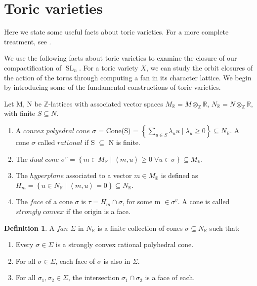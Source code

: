 \documentclass{amsart}
\newcommand{\R}{\mathbb{R}}
\newcommand{\Z}{\mathbb{Z}}
\DeclareMathOperator{\SL}{SL}
\theoremstyle{definition}
\newtheorem{definition}[theorem]{Definition}
\theoremstyle{remark}
\numberwithin{equation}{section}
\begin{document}
\appendix

\section{Toric varieties}

Here we state some useful facts about toric varieties. For a more complete treatment, see \cite{TV}.

We use the following facts about toric varieties to examine the closure of our compactification of $\SL_n$. For a toric variety $X$, we can study the orbit closures of the action of the torus through computing a fan in its character lattice.  We begin by introducing some of the fundamental constructions of toric varieties. 

Let M, N be $\Z$-lattices with associated vector spaces $M_\R = M\otimes_\Z \R$, $N_\R = N \otimes_\Z \R$, with finite $S \subseteq N$.

\begin{enumerate}

\item A $convex\; polyedral\; cone$ $\sigma$ = Cone(S) = $\left\{ {\displaystyle\sum\limits_{u\in S}\lambda_uu \; |\; \lambda_u \geq 0}\right\}\subseteq N_\R$. A cone $\sigma$ called $rational$ if S $\subseteq$ N is finite. 


\item The $dual \; cone$ $\sigma^v = \left\{ { m \in M_\R \; | \; \left\langle{m,u}\right\rangle \geq 0\; \forall u \in \sigma }\right\}\subseteq M_\R$. 

\item The $hyperplane$ associated to a vector $m \in M_\R$ is defined as $H_m = \left\{ {u \in N_\R \; | \;\left\langle{m,u}\right\rangle = 0}\right\}\subseteq N_\R$. 

\item The $face$ of a cone $\sigma$ is $\tau = H_m \cap \sigma$, for some m $\in \sigma^v$. A cone is called $strongly\; convex$ if the origin is a face. 


\end{enumerate}

\begin{definition}
A $fan$ $\Sigma$ in $N_\R$ is a finite collection of cones $\sigma \subseteq N_\R$ such that:
\begin{enumerate}
\item Every $\sigma \in \Sigma$ is a strongly convex rational polyhedral cone.
\item For all $\sigma \in \Sigma$, each face of $\sigma$ is also in $\Sigma$. 
\item For all $\sigma_1, \sigma_2 \in \Sigma$, the intersection $\sigma_1 \cap \sigma_2$ is a face of each. 
\end{enumerate}
\end{definition}
\end{document}
